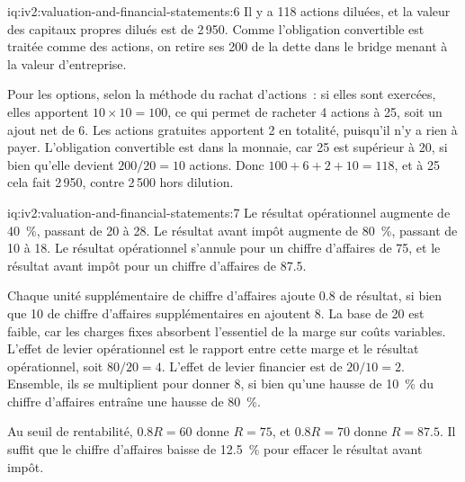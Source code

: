 \begin{solution}{iq:iv2:valuation-and-financial-statements:6}
Il y a 118 actions diluées, et la valeur des capitaux propres dilués est de 2\,950. Comme l'obligation convertible est traitée comme des actions, on retire ses 200 de la dette dans le bridge menant à la valeur d'entreprise.

Pour les options, selon la méthode du rachat d'actions~: si elles sont exercées, elles apportent $10 \times 10 = 100$, ce qui permet de racheter 4 actions à 25, soit un ajout net de 6. Les actions gratuites apportent 2 en totalité, puisqu'il n'y a rien à payer. L'obligation convertible est dans la monnaie, car 25 est supérieur à 20, si bien qu'elle devient $200/20 = 10$ actions. Donc $100 + 6 + 2 + 10 = 118$, et à 25 cela fait 2\,950, contre 2\,500 hors dilution.

\end{solution}

\begin{solution}{iq:iv2:valuation-and-financial-statements:7}
Le résultat opérationnel augmente de 40~\%, passant de 20 à 28. Le résultat avant impôt augmente de 80~\%, passant de 10 à 18. Le résultat opérationnel s'annule pour un chiffre d'affaires de 75, et le résultat avant impôt pour un chiffre d'affaires de 87.5.

Chaque unité supplémentaire de chiffre d'affaires ajoute 0.8 de résultat, si bien que 10 de chiffre d'affaires supplémentaires en ajoutent 8. La base de 20 est faible, car les charges fixes absorbent l'essentiel de la marge sur coûts variables. L'effet de levier opérationnel est le rapport entre cette marge et le résultat opérationnel, soit $80/20 = 4$. L'effet de levier financier est de $20/10 = 2$. Ensemble, ils se multiplient pour donner 8, si bien qu'une hausse de 10~\% du chiffre d'affaires entraîne une hausse de 80~\%.

Au seuil de rentabilité, $0.8R = 60$ donne $R = 75$, et $0.8R = 70$ donne $R = 87.5$. Il suffit que le chiffre d'affaires baisse de 12.5~\% pour effacer le résultat avant impôt.

\end{solution}

